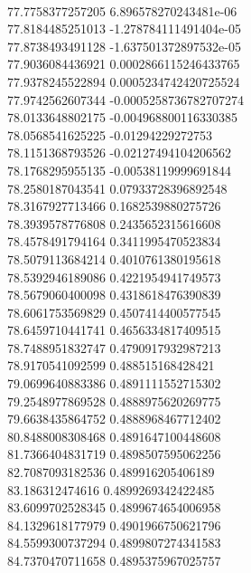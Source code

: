{ \\
77.7758377257205 6.896578270243481e-06
 \\
77.8184485251013 -1.278784111491404e-05
 \\
77.8738493491128 -1.637501372897532e-05
 \\
77.9036084436921 0.0002866115246433765
 \\
77.9378245522894 0.0005234742420725524
 \\
77.9742562607344 -0.0005258736782707274
 \\
78.0133648802175 -0.004968800116330385
 \\
78.0568541625225 -0.01294229272753
 \\
78.1151368793526 -0.02127494104206562
 \\
78.1768295955135 -0.00538119999691844
 \\
78.2580187043541 0.07933728396892548
 \\
78.3167927713466 0.1682539880275726
 \\
78.3939578776808 0.2435652315616608
 \\
78.4578491794164 0.3411995470523834
 \\
78.5079113684214 0.4010761380195618
 \\
78.5392946189086 0.4221954941749573
 \\
78.5679060400098 0.4318618476390839
 \\
78.6061753569829 0.4507414400577545
 \\
78.6459710441741 0.4656334817409515
 \\
78.7488951832747 0.4790917932987213
 \\
78.9170541092599 0.488515168428421
 \\
79.0699640883386 0.4891111552715302
 \\
79.2548977869528 0.4888975620269775
 \\
79.6638435864752 0.4888968467712402
 \\
80.8488008308468 0.4891647100448608
 \\
81.7366404831719 0.4898507595062256
 \\
82.7087093182536 0.489916205406189
 \\
83.186312474616 0.4899269342422485
 \\
83.6099702528345 0.4899674654006958
 \\
84.1329618177979 0.4901966750621796
 \\
84.5599300737294 0.4899807274341583
 \\
84.7370470711658 0.4895375967025757
 \\
}
